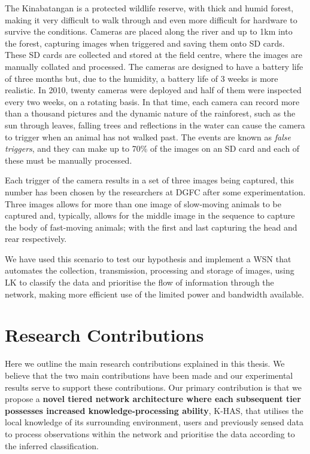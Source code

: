 The Kinabatangan is a protected wildlife reserve, with thick and humid forest, making it very difficult to walk through and even more difficult for hardware to survive the conditions. Cameras are placed along the river and up to 1km into the forest, capturing images when triggered and saving them onto SD cards. These SD cards are collected and stored at the field centre, where the images are manually collated and processed. The cameras are designed to have a battery life of three months but, due to the humidity, a battery life of 3 weeks is more realistic. In 2010, twenty cameras were deployed and half of them were inspected every two weeks, on a rotating basis. In that time, each camera can record more than a thousand pictures and the dynamic nature of the rainforest, such as the sun through leaves, falling trees and reflections in the water can cause the camera to trigger when an animal has not walked past. The events are known as \textit{false triggers}, and they can make up to 70\% of the images on an SD card and each of these must be manually processed. 

Each trigger of the camera results in a set of three images being captured, this number has been chosen by the researchers at DGFC after some experimentation. Three images allows for more than one image of slow-moving animals to be captured and, typically, allows for the middle image in the sequence to capture the body of fast-moving animals; with the first and last capturing the head and rear respectively.

We have used this scenario to test our hypothesis and implement a WSN that automates the collection, transmission, processing and storage of images, using LK to classify the data and prioritise the flow of information through the network, making more efficient use of the limited power and bandwidth available. 

\section{Research Contributions}

Here we outline the main research contributions explained in this thesis. We believe that the two main contributions have been made and our experimental results serve to support these contributions.
Our primary contribution is that we propose a \textbf{novel tiered network architecture where each subsequent tier possesses increased knowledge-processing ability}, K-HAS, that utilises the local knowledge of its surrounding environment, users and previously sensed data to process observations within the network and prioritise the data according to the inferred classification. 

